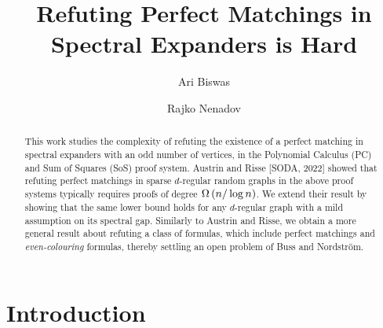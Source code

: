 \documentclass[11pt]{article}
\title{Refuting Perfect Matchings in Spectral Expanders is Hard}
\author[1]{Ari Biswas}
\author[2]{Rajko Nenadov}
\affil[1]{\small University Of Warwick, United Kingdom}
\affil[2]{\small University Of Auckland, New Zealand}
\date{}
\begin{document}
\maketitle
\begin{abstract}
This work studies the complexity of refuting the existence of a perfect matching in spectral expanders with an odd number of vertices, in the Polynomial Calculus (PC) and Sum of Squares (SoS) proof system.
Austrin and Risse [SODA, 2022] showed that refuting perfect matchings in sparse $d$-regular random graphs in the above proof systems typically requires proofs of degree $\Omega\left(n/\log n\right)$. 
We extend their result by showing that the same lower bound holds for any $d$-regular graph with a mild assumption on its spectral gap.
Similarly to Austrin and Risse, we obtain a more general result about refuting a class of formulas, which include perfect matchings and \emph{even-colouring} formulas, thereby settling an open problem of Buss and Nordstr\"{o}m.
\end{abstract}

\section{Introduction}


\end{document}
